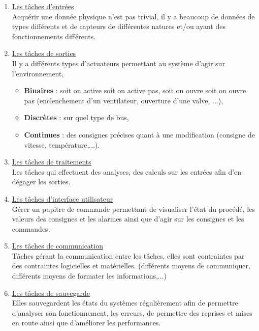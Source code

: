 \documentclass{article}
\newcommand{\ora}[1]{\textcolor{darko}{#1}}
\begin{document}
\begin{enumerate}
\item \ora{\underline{Les tâches d'entrées}} \\
Acquérir une donnée physique n'est pas trivial, il y a beaucoup de données de types différents et de 
capteurs de différentes natures et/ou ayant des fonctionnements différents. 
\item \ora{\underline{Les tâches de sorties}} \\
Il y a différents types d'actuateurs permettant au système d'agir sur l'environnement, 
\begin{itemize}
\item \textbf{Binaires} : soit on active soit on active pas, soit on ouvre soit on ouvre pas (enclenchement
d'un ventilateur, ouverture d'une valve, ...),
\item \textbf{Discrètes} : sur quel type de bus,
\item \textbf{Continues} : des consignes précises quant à une modification (consigne de vitesse, 
température,...).
\end{itemize}
\item \ora{\underline{Les tâches de traitements}} \\
Les tâches qui effectuent des analyses, des calculs sur les entrées afin d'en dégager les sorties.
\item \ora{\underline{Les tâches d'interface utilisateur}} \\
Gérer un pupitre de commande permettant de visualiser l'état du procédé, les valeurs des consignes et les
alarmes ainsi que d'agir sur les consignes et les commandes.
\item \ora{\underline{Les tâches de communication}} \\
Tâches gérant la communication entre les tâches, elles sont contraintes par des contraintes logicielles et 
matérielles. (différents moyens de communiquer, différents moyens de formater les informations,...)
\item \ora{\underline{Les tâches de sauvegarde}} \\
Elles sauvegardent les états du systèmes régulièrement afin de permettre d'analyser son fonctionnement, les
erreurs, de permettre des reprises et mises en route ainsi que d'améliorer les performances.
\end{enumerate}
\end{document}
